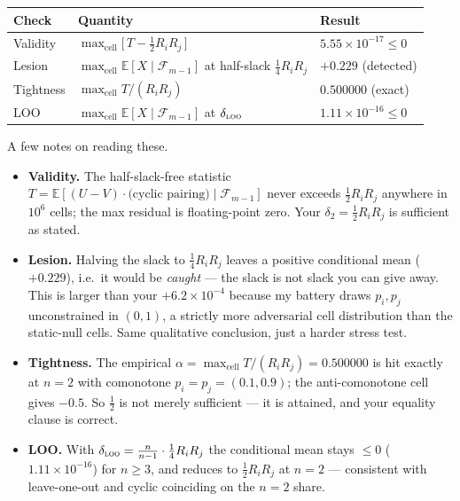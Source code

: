 \documentclass[11pt,a4paper]{article}
\begin{document}
\medskip
\begin{center}
\begin{tabular}{lll}
\toprule
Check & Quantity & Result \\
\midrule
Validity    & $\max_{\text{cell}} \big[\,T - \tfrac12 R_i R_j\,\big]$ &
  $5.55\times 10^{-17} \le 0$ \\
Lesion      & $\max_{\text{cell}} \mathbb{E}[X \mid \mathcal{F}_{m-1}]$
  at half-slack $\tfrac14 R_i R_j$ & $+0.229$ (detected) \\
Tightness   & $\max_{\text{cell}} T / (R_i R_j)$ &
  $0.500000$ (exact) \\
LOO         & $\max_{\text{cell}} \mathbb{E}[X \mid \mathcal{F}_{m-1}]$
  at $\delta_{\textsc{loo}}$ & $1.11\times 10^{-16} \le 0$ \\
\bottomrule
\end{tabular}
\end{center}
\medskip

\noindent A few notes on reading these.

\begin{itemize}
\item \textbf{Validity.} The half-slack-free statistic
  $T = \mathbb{E}[(U - V)\cdot \text{(cyclic pairing)} \mid \mathcal{F}_{m-1}]$
  never exceeds $\tfrac12 R_i R_j$ anywhere in $10^{6}$ cells; the max residual is
  floating-point zero. Your $\delta_2 = \tfrac12 R_i R_j$ is sufficient as stated.

\item \textbf{Lesion.} Halving the slack to $\tfrac14 R_i R_j$ leaves a positive
  conditional mean ($+0.229$), i.e.\ it would be \emph{caught} --- the slack is not
  slack you can give away. This is larger than your $+6.2\times 10^{-4}$ because my
  battery draws $p_i, p_j$ unconstrained in $(0,1)$, a strictly more adversarial
  cell distribution than the static-null cells. Same qualitative conclusion, just a
  harder stress test.

\item \textbf{Tightness.} The empirical
  $\alpha = \max_{\text{cell}} T/(R_i R_j) = 0.500000$ is hit exactly at $n = 2$
  with comonotone $p_i = p_j = (0.1, 0.9)$; the anti-comonotone cell gives $-0.5$.
  So $\tfrac12$ is not merely sufficient --- it is attained, and your equality clause
  is correct.

\item \textbf{LOO.} With $\delta_{\textsc{loo}} = \tfrac{n}{n-1}\cdot
  \tfrac14 R_i R_j$ the conditional mean stays $\le 0$ ($1.11\times 10^{-16}$) for
  $n \ge 3$, and reduces to $\tfrac12 R_i R_j$ at $n = 2$ --- consistent with
  leave-one-out and cyclic coinciding on the $n = 2$ share.
\end{itemize}
\end{document}
